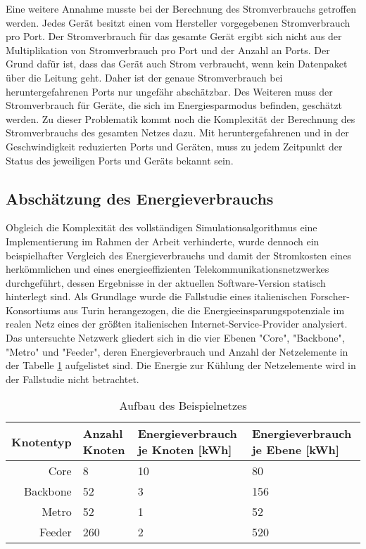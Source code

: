 Eine weitere Annahme musste bei der Berechnung des Stromverbrauchs getroffen werden. Jedes Gerät besitzt einen vom Hersteller vorgegebenen Stromverbrauch pro Port. Der Stromverbrauch für das gesamte Gerät ergibt sich nicht aus der Multiplikation von Stromverbrauch pro Port und der Anzahl an Ports. Der Grund dafür ist, dass das Gerät auch Strom verbraucht, wenn kein Datenpaket über die Leitung geht. Daher ist der genaue Stromverbrauch bei heruntergefahrenen Ports nur ungefähr abschätzbar. Des Weiteren  muss der Stromverbrauch für Geräte, die sich im Energiesparmodus befinden, geschätzt werden. Zu dieser Problematik kommt noch die Komplexität der Berechnung des Stromverbrauchs des gesamten Netzes dazu. Mit heruntergefahrenen und in der Geschwindigkeit reduzierten Ports und Geräten, muss zu jedem Zeitpunkt der Status des jeweiligen Ports und Geräts bekannt sein.  


\subsection{Abschätzung des Energieverbrauchs} \label{subsec:MethSch}

Obgleich die Komplexität des vollständigen Simulationsalgorithmus eine Implementierung im Rahmen der Arbeit verhinderte, wurde dennoch ein beispielhafter Vergleich des Energieverbrauchs und damit der Stromkosten eines herkömmlichen und eines energieeffizienten Telekommunikationsnetzwerkes durchgeführt, dessen Ergebnisse in der aktuellen Software-Version statisch hinterlegt sind. Als Grundlage wurde die Fallstudie eines italienischen Forscher-Konsortiums aus Turin herangezogen, die die Energieeinsparungspotenziale im realen Netz eines der größten italienischen Internet-Service-Provider analysiert\cite{Chiaraviglio2009}. Das untersuchte Netzwerk gliedert sich in die vier Ebenen "Core", "Backbone", "Metro" und "Feeder", deren Energieverbrauch und Anzahl der Netzelemente in der Tabelle \ref{tab:beispielnetz} aufgelistet sind\cite[2]{Chiaraviglio2009}. Die Energie zur Kühlung der Netzelemente wird in der Fallstudie nicht betrachtet.




\begin{table}[ht]
\centering
\begin{tabularx}{\textwidth}{ | r | l | X | X | }
	\hline
	Knotentyp & Anzahl Knoten & Energieverbrauch \newline je Knoten [kWh] & Energieverbrauch \newline je Ebene [kWh]\\ \hline\hline
Core & 8 & 10 & 80\\ \hline
Backbone & 52 & 3 & 156\\ \hline
Metro & 52 & 1 & 52\\ \hline
Feeder & 260 & 2 & 520\\ \hline
\end{tabularx}
\caption{Aufbau des Beispielnetzes}
\label{tab:beispielnetz}
\end{table}


